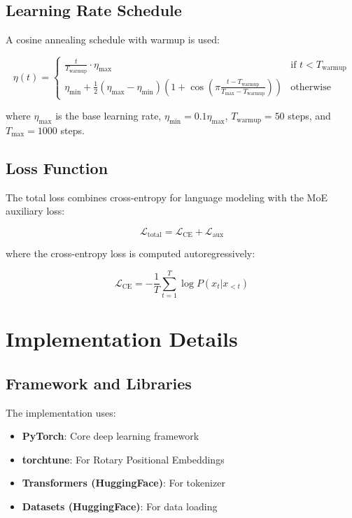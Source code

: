 \documentclass[11pt,a4paper]{article}
\begin{document}
\subsection{Learning Rate Schedule}

A cosine annealing schedule with warmup is used:

\begin{equation}
\eta(t) = \begin{cases}
\frac{t}{T_{\text{warmup}}} \cdot \eta_{\text{max}} & \text{if } t < T_{\text{warmup}} \\
\eta_{\text{min}} + \frac{1}{2}(\eta_{\text{max}} - \eta_{\text{min}})\left(1 + \cos\left(\pi \frac{t - T_{\text{warmup}}}{T_{\text{max}} - T_{\text{warmup}}}\right)\right) & \text{otherwise}
\end{cases}
\end{equation}

where $\eta_{\text{max}}$ is the base learning rate, $\eta_{\text{min}} = 0.1 \eta_{\text{max}}$, $T_{\text{warmup}} = 50$ steps, and $T_{\text{max}} = 1000$ steps.

\subsection{Loss Function}

The total loss combines cross-entropy for language modeling with the MoE auxiliary loss:

\begin{equation}
\mathcal{L}_{\text{total}} = \mathcal{L}_{\text{CE}} + \mathcal{L}_{\text{aux}}
\end{equation}

where the cross-entropy loss is computed autoregressively:

\begin{equation}
\mathcal{L}_{\text{CE}} = -\frac{1}{T} \sum_{t=1}^{T} \log P(x_t | x_{<t})
\end{equation}

\section{Implementation Details}

\subsection{Framework and Libraries}

The implementation uses:
\begin{itemize}
    \item \textbf{PyTorch}: Core deep learning framework
    \item \textbf{torchtune}: For Rotary Positional Embeddings
    \item \textbf{Transformers (HuggingFace)}: For tokenizer
    \item \textbf{Datasets (HuggingFace)}: For data loading
\end{itemize}
\end{document}
